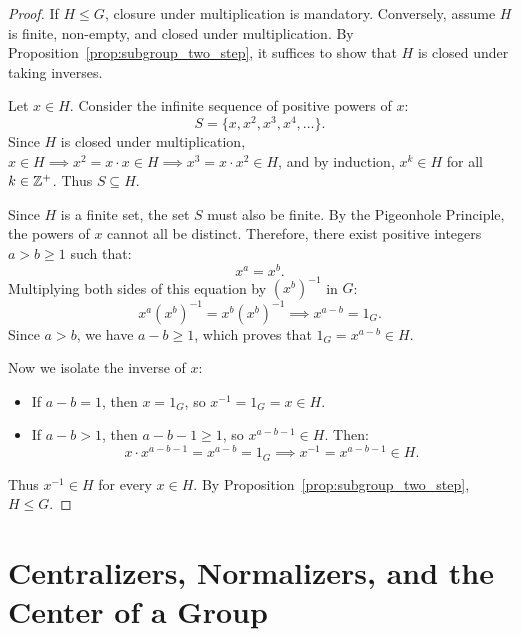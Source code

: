 \begin{proof}
If $H \le G$, closure under multiplication is mandatory.
Conversely, assume $H$ is finite, non-empty, and closed under multiplication. By Proposition~\ref{prop:subgroup_two_step}, it suffices to show that $H$ is closed under taking inverses.

Let $x \in H$. Consider the infinite sequence of positive powers of $x$:
\begin{equation*}
S = \{ x, x^2, x^3, x^4, \dots \}.
\end{equation*}
Since $H$ is closed under multiplication, $x \in H \implies x^2 = x \cdot x \in H \implies x^3 = x \cdot x^2 \in H$, and by induction, $x^k \in H$ for all $k \in \mathbb{Z}^+$. Thus $S \subseteq H$.

Since $H$ is a finite set, the set $S$ must also be finite. By the Pigeonhole Principle, the powers of $x$ cannot all be distinct. Therefore, there exist positive integers $a > b \ge 1$ such that:
\begin{equation*}
x^a = x^b.
\end{equation*}
Multiplying both sides of this equation by $(x^b)^{-1}$ in $G$:
\begin{equation*}
x^a (x^b)^{-1} = x^b (x^b)^{-1} \implies x^{a-b} = 1_G.
\end{equation*}
Since $a > b$, we have $a - b \ge 1$, which proves that $1_G = x^{a-b} \in H$.

Now we isolate the inverse of $x$:
\begin{itemize}[leftmargin=1.5em, itemsep=4pt]
    \item If $a - b = 1$, then $x = 1_G$, so $x^{-1} = 1_G = x \in H$.
    \item If $a - b > 1$, then $a - b - 1 \ge 1$, so $x^{a-b-1} \in H$. Then:
    \begin{equation*}
    x \cdot x^{a-b-1} = x^{a-b} = 1_G \implies x^{-1} = x^{a-b-1} \in H.
    \end{equation*}
\end{itemize}
Thus $x^{-1} \in H$ for every $x \in H$. By Proposition~\ref{prop:subgroup_two_step}, $H \le G$.
\end{proof}

\section{Centralizers, Normalizers, and the Center of a Group}
\label{sec:center}

